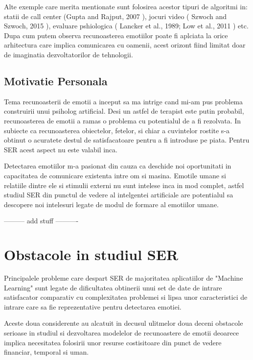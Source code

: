 \documentclass[a4paper,12pt, twoside]{book}
\begin{document}
					Alte exemple care merita mentionate sunt folosirea acestor tipuri de algoritmi in: statii de call center (Gupta and Rajput, 2007 \cite{gupta}), jocuri video ( Szwoch and Szwoch, 2015 \cite{szwoch}), evaluare pshiologica ( Lancker et al., 1989; Low et al., 2011 \cite{lancker} ) etc. Dupa cum putem observa recunoasterea emotiilor poate fi aplciata la orice arhitectura care implica comunicarea cu oamenii, acest orizont fiind limitat doar de imaginatia dezvoltatorilor de tehnologii. \par				
			\subsection{Motivatie Personala}				
					Tema recunoasterii de emotii a inceput sa ma intrige cand mi-am pus problema construirii unui psiholog artificial. Desi un astfel de terapist este putin probabil, recunoasterea de emotii a ramas o problema cu potentialul de a fi rezolvata. In subiecte ca recunoasterea obiectelor, fetelor, si chiar a cuvintelor rostite s-a obtinut o acuratete destul de satisfacatoare pentru a fi introduse pe piata. Pentru SER acest aspect nu este valabil inca. \par
					Detectarea emotiilor m-a pasionat din cauza ca deschide noi oportunitati in capacitatea de comunicare existenta intre om si masina. Emotile umane si relatiile dintre ele si stimulii externi nu sunt intelese inca in mod complet, astfel studiul SER din punctul de vedere al intelgentei artificiale are potentialul sa descopere noi intelesuri legate de modul de formare al emotiilor umane. \par
					\hfill \par
					--------- add stuff ----------
			\section{Obstacole in studiul SER}			
				Principalele probleme care despart SER de majoritatea aplicatiilor de "Machine Learning" sunt legate de dificultatea obtinerii unui set de date de intrare satisfacator comparativ cu complexitatea problemei si lipsa unor caracteristici de intrare care sa fie reprezentative pentru detectarea emotiei.\par
				
				Aceste doua considerente au alcatuit in decusul ulitmelor doua deceni obstacole serioase in studiul si dezvoltarea modelelor de recunoastere de emotii deoarece implica necesitatea folosirii unor resurse costisitoare din punct de vedere financiar, temporal si uman.\par
				
\end{document}

